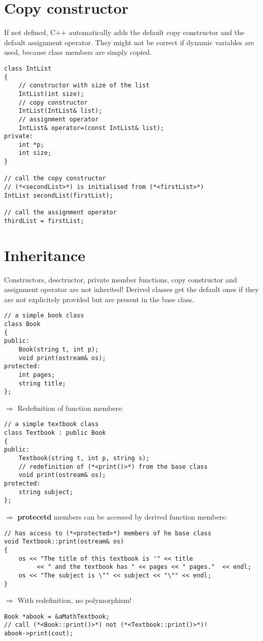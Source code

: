 \documentclass[10pt]{article}
\begin{document}
\section{Copy constructor}
\small
If not defined, C++ automatically adds the default copy
constructor and the default assignment operator.
They might not be correct if dynamic variables are used,
because class members are simply copied.
\begin{lstlisting}
class IntList
{
    // constructor with size of the list
    IntList(int size);
    // copy constructor
    IntList(IntList& list);
    // assignment operator
    IntList& operator=(const IntList& list);
private:
    int *p;
    int size;
}

// call the copy constructor
// (*<secondList>*) is initialised from (*<firstList>*)
IntList secondList(firstList); 

// call the assignment operator
thirdList = firstList;
\end{lstlisting}
%
%
\section{Inheritance}
\small
Constructors, desctructor, private member functions, copy constructor
and assignment operator are not inherited! Derived classes get the default ones
if they are not explicitely provided but are present in the base class.
\begin{lstlisting}
// a simple book class
class Book
{
public:
    Book(string t, int p);
    void print(ostream& os);
protected:
    int pages;
    string title;
};
\end{lstlisting}
$\Rightarrow$ Redefinition of function members:
\begin{lstlisting}
// a simple textbook class
class Textbook : public Book
{
public:
    Textbook(string t, int p, string s);
    // redefinition of (*<print()>*) from the base class
    void print(ostream& os);
protected:
    string subject;
};
\end{lstlisting}
$\Rightarrow$ \textbf{protecetd} members can be accessed
by derived function members:
\begin{lstlisting}
// has access to (*<protected>*) members of he base class
void Textbook::print(ostream& os)
{
    os << "The title of this textbook is '" << title
         << " and the textbook has " << pages << " pages."  << endl;
    os << "The subject is \"" << subject << "\"" << endl;
}
\end{lstlisting}
$\Rightarrow$ With redefinition, no polymorphism!
\begin{lstlisting}
Book *abook = &aMathTextbook;
// call (*<Book::print()>*) not (*<Textbook::print()>*)!
abook->print(cout);
\end{lstlisting}
%
%
\end{document}
